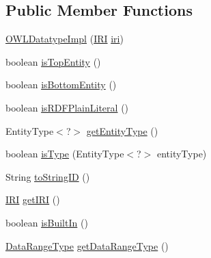 \subsection*{Public Member Functions}
\begin{DoxyCompactItemize}
\item 
\hyperlink{classuk_1_1ac_1_1manchester_1_1cs_1_1owl_1_1owlapi_1_1_o_w_l_datatype_impl_a8d20d3c2e517dfb5ca2fb2d4bbdacbe4}{O\-W\-L\-Datatype\-Impl} (\hyperlink{classorg_1_1semanticweb_1_1owlapi_1_1model_1_1_i_r_i}{I\-R\-I} \hyperlink{classuk_1_1ac_1_1manchester_1_1cs_1_1owl_1_1owlapi_1_1_o_w_l_datatype_impl_aa546680ee73b8b33a63671c10235b331}{iri})
\item 
boolean \hyperlink{classuk_1_1ac_1_1manchester_1_1cs_1_1owl_1_1owlapi_1_1_o_w_l_datatype_impl_a132f43fac328fdb17995845eb75a2996}{is\-Top\-Entity} ()
\item 
boolean \hyperlink{classuk_1_1ac_1_1manchester_1_1cs_1_1owl_1_1owlapi_1_1_o_w_l_datatype_impl_a2731100a89e66d467ea38b45b86002ab}{is\-Bottom\-Entity} ()
\item 
boolean \hyperlink{classuk_1_1ac_1_1manchester_1_1cs_1_1owl_1_1owlapi_1_1_o_w_l_datatype_impl_aaabcee5bfe04497830145edf3cf9ff65}{is\-R\-D\-F\-Plain\-Literal} ()
\item 
Entity\-Type$<$?$>$ \hyperlink{classuk_1_1ac_1_1manchester_1_1cs_1_1owl_1_1owlapi_1_1_o_w_l_datatype_impl_a9c94b2355a2b4c6ded6cbeb69193623e}{get\-Entity\-Type} ()
\item 
boolean \hyperlink{classuk_1_1ac_1_1manchester_1_1cs_1_1owl_1_1owlapi_1_1_o_w_l_datatype_impl_a5f3fe777173453814ba72da7f93f3522}{is\-Type} (Entity\-Type$<$?$>$ entity\-Type)
\item 
String \hyperlink{classuk_1_1ac_1_1manchester_1_1cs_1_1owl_1_1owlapi_1_1_o_w_l_datatype_impl_adcc8c503fa56cff67946c47b1dd1868d}{to\-String\-I\-D} ()
\item 
\hyperlink{classorg_1_1semanticweb_1_1owlapi_1_1model_1_1_i_r_i}{I\-R\-I} \hyperlink{classuk_1_1ac_1_1manchester_1_1cs_1_1owl_1_1owlapi_1_1_o_w_l_datatype_impl_a4c686fbfb5e65b7933596980c4eee243}{get\-I\-R\-I} ()
\item 
boolean \hyperlink{classuk_1_1ac_1_1manchester_1_1cs_1_1owl_1_1owlapi_1_1_o_w_l_datatype_impl_ada01c255222b1e8d9bce29f0be4c09c1}{is\-Built\-In} ()
\item 
\hyperlink{enumorg_1_1semanticweb_1_1owlapi_1_1model_1_1_data_range_type}{Data\-Range\-Type} \hyperlink{classuk_1_1ac_1_1manchester_1_1cs_1_1owl_1_1owlapi_1_1_o_w_l_datatype_impl_afbfce75adcb7927f14e05b3eeccdc725}{get\-Data\-Range\-Type} ()

\end{DoxyCompactItemize}
